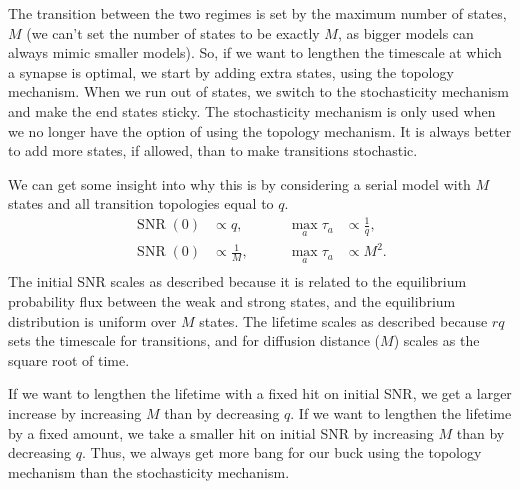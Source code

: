 \documentclass[12pt]{article}
\DeclareMathOperator{\snr}{SNR}
\begin{document}
The transition between the two regimes is set by the maximum number of states, $M$ (we can't set the number of states to be exactly $M$, as bigger models can always mimic smaller models).
So, if we want to lengthen the timescale at which a synapse is optimal, we start by adding extra states, using the topology mechanism.
When we run out of states, we switch to the stochasticity mechanism and make the end states sticky.
The stochasticity mechanism is only used when we no longer have the option of using the topology mechanism.
It is always better to add more states, if allowed, than to make transitions stochastic.

We can get some insight into why this is by considering a serial model with $M$ states and all transition topologies equal to $q$.
%
\begin{equation*}
\begin{aligned}
  \snr(0) &\propto q,
  &\qquad
  \max_a \tau_a &\propto \frac{1}{q}, \\
  \snr(0) &\propto \frac{1}{M},
  &\qquad
  \max_a \tau_a &\propto M^2. \\
\end{aligned}
\end{equation*}
%
The initial SNR scales as described because it is related to the equilibrium probability flux between the weak and strong states, and the equilibrium distribution is uniform over $M$ states.
The lifetime scales as described because $rq$ sets the timescale for transitions, and for diffusion distance ($M$) scales as the square root of time.

If we want to lengthen the lifetime with a fixed hit on initial SNR, we get a larger increase by increasing $M$ than by decreasing $q$.
If we want to lengthen the lifetime by a fixed amount, we take a smaller hit on initial SNR by increasing $M$ than by decreasing $q$.
Thus, we always get more bang for our buck using the topology mechanism than the stochasticity mechanism.













\end{document}
